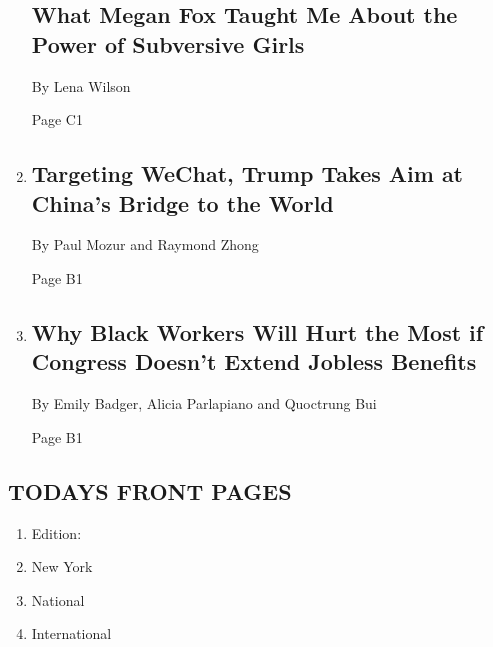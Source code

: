 \begin{enumerate}
  \hypertarget{what-megan-fox-taught-me-about-the-power-of-subversive-girls}{%
  \subsection{What Megan Fox Taught Me About the Power of Subversive
  Girls}\label{what-megan-fox-taught-me-about-the-power-of-subversive-girls}}

  By Lena Wilson

  Page C1
\item
  \href{/2020/08/07/business/trump-china-wechat-tiktok.html}{}

  \hypertarget{targeting-wechat-trump-takes-aim-at-chinas-bridge-to-the-world}{%
  \subsection{Targeting WeChat, Trump Takes Aim at China's Bridge to the
  World}\label{targeting-wechat-trump-takes-aim-at-chinas-bridge-to-the-world}}

  By Paul Mozur and Raymond Zhong

  Page B1
\item
  \href{/2020/08/07/upshot/unemployment-benefits-racial-disparity.html}{}

  \hypertarget{why-black-workers-will-hurt-the-most-if-congress-doesnt-extend-jobless-benefits}{%
  \subsection{Why Black Workers Will Hurt the Most if Congress Doesn't
  Extend Jobless
  Benefits}\label{why-black-workers-will-hurt-the-most-if-congress-doesnt-extend-jobless-benefits}}

  By Emily Badger, Alicia Parlapiano and Quoctrung Bui

  Page B1
\end{enumerate}

\hypertarget{todays-front-pages}{%
\subsection{TODAYS FRONT PAGES}\label{todays-front-pages}}

\begin{enumerate}
\def\labelenumi{\arabic{enumi}.}
\tightlist
\item
  Edition:
\item
  New York
\item
  National
\item
  International
\end{enumerate}

